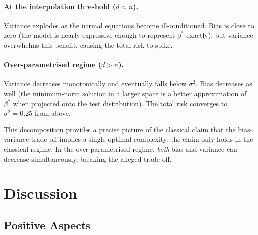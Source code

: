 \documentclass[11pt,a4paper]{article}
\begin{document}
\paragraph{At the interpolation threshold ($d \approx n$).}
Variance explodes as the normal equations become ill-conditioned.
Bias is close to zero (the model is nearly expressive enough to represent $\beta^*$ exactly),
but variance overwhelms this benefit, causing the total risk to spike.

\paragraph{Over-parametrised regime ($d > n$).}
Variance decreases monotonically and eventually falls below $\sigma^2$.
Bias decreases as well (the minimum-norm solution in a larger space is a better approximation
of $\beta^*$ when projected onto the test distribution).
The total risk converges to $\sigma^2 = 0.25$ from above.

This decomposition provides a precise picture of the classical claim that the
bias--variance trade-off implies a single optimal complexity: the claim only holds in the
classical regime.
In the over-parametrised regime, \emph{both} bias and variance can decrease simultaneously,
breaking the alleged trade-off.


\section{Discussion}
\label{sec:discussion}

\subsection{Positive Aspects}
\end{document}
